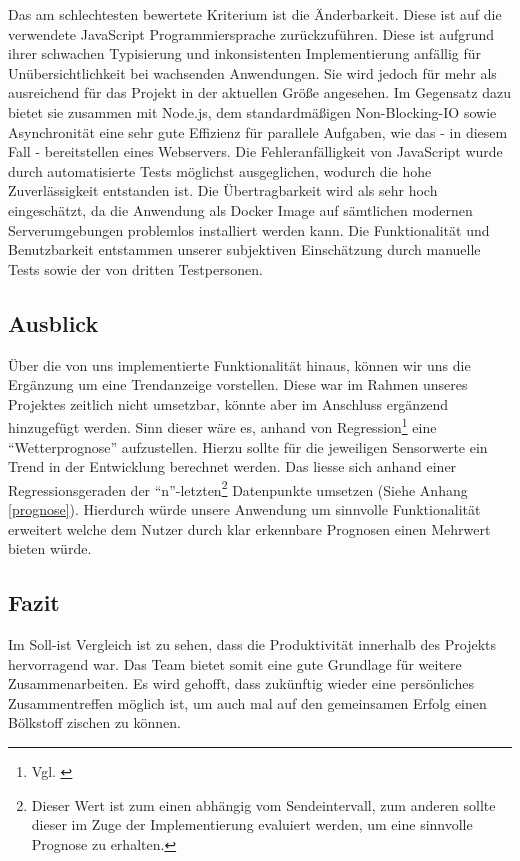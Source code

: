 Das am schlechtesten bewertete Kriterium ist die Änderbarkeit.
Diese ist auf die verwendete JavaScript Programmiersprache zurückzuführen.
Diese ist aufgrund ihrer schwachen Typisierung und inkonsistenten Implementierung anfällig für Unübersichtlichkeit bei wachsenden Anwendungen.
Sie wird jedoch für mehr als ausreichend für das Projekt in der aktuellen Größe angesehen.
Im Gegensatz dazu bietet sie zusammen mit Node.js, dem standardmäßigen Non-Blocking-IO sowie
Asynchronität eine sehr gute Effizienz für parallele Aufgaben, wie das - in diesem Fall - bereitstellen eines Webservers.
Die Fehleranfälligkeit von JavaScript wurde durch automatisierte Tests möglichst ausgeglichen, wodurch die hohe Zuverlässigkeit
entstanden ist.
Die Übertragbarkeit wird als sehr hoch eingeschätzt, da die Anwendung als Docker Image auf sämtlichen modernen
Serverumgebungen problemlos installiert werden kann.
Die Funktionalität und Benutzbarkeit entstammen unserer subjektiven Einschätzung durch manuelle Tests sowie der von
dritten Testpersonen.
\\

\subsection{Ausblick}
Über die von uns implementierte Funktionalität hinaus, können wir uns die Ergänzung um eine Trendanzeige vorstellen.
Diese war im Rahmen unseres Projektes zeitlich nicht umsetzbar, könnte aber im Anschluss ergänzend hinzugefügt werden.
Sinn dieser wäre es, anhand von Regression\footnote{Vgl. \cite{regression}} eine \enquote{Wetterprognose} aufzustellen.
Hierzu sollte für die jeweiligen Sensorwerte ein Trend in der Entwicklung berechnet werden.
Das liesse sich anhand einer Regressionsgeraden der \enquote{n}-letzten\footnote{Dieser Wert ist zum einen abhängig vom Sendeintervall, zum anderen sollte dieser im Zuge der Implementierung evaluiert werden, um eine sinnvolle Prognose zu erhalten.} Datenpunkte umsetzen (Siehe Anhang \ref{prognose}).
Hierdurch würde unsere Anwendung um sinnvolle Funktionalität erweitert welche dem Nutzer durch klar erkennbare Prognosen einen Mehrwert bieten würde.

\subsection{Fazit}\label{subsec:fazit}%
Im Soll-ist Vergleich ist zu sehen, dass die Produktivität innerhalb des Projekts hervorragend war. Das Team bietet somit eine
gute Grundlage für weitere Zusammenarbeiten. Es wird gehofft, dass zukünftig wieder eine persönliches Zusammentreffen möglich ist,
um auch mal auf den gemeinsamen Erfolg einen Bölkstoff zischen zu können.


